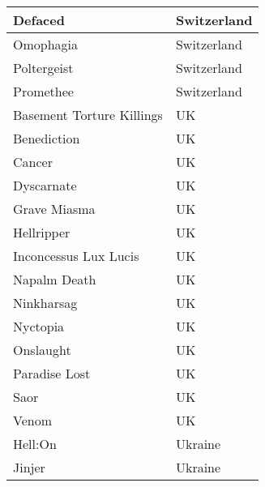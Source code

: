 \documentclass[12pt, a4paper, twoside]{report}
\begin{document}
\begin{center}
\begin{longtable}{|p{5cm}|p{5cm}|}
Defaced & Switzerland \\ \hline
Omophagia & Switzerland \\ \hline
Poltergeist & Switzerland \\ \hline
Promethee & Switzerland \\ \hline
Basement Torture Killings & UK \\ \hline
Benediction & UK \\ \hline
Cancer & UK \\ \hline
Dyscarnate & UK \\ \hline
Grave Miasma & UK \\ \hline
Hellripper & UK \\ \hline
Inconcessus Lux Lucis & UK \\ \hline
Napalm Death & UK \\ \hline
Ninkharsag & UK \\ \hline
Nyctopia & UK \\ \hline
Onslaught & UK \\ \hline
Paradise Lost & UK \\ \hline
Saor & UK \\ \hline
Venom & UK \\ \hline
Hell:On & Ukraine \\ \hline
Jinjer & Ukraine \\ \hline
		\end{longtable}
	\end{center}
\end{document}
